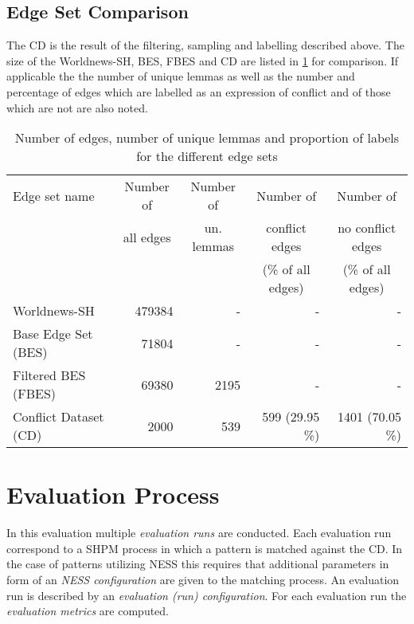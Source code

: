 \documentclass[11pt]{scrreprt}
\begin{document}

\subsection{Edge Set Comparison}
The CD is the result of the filtering, sampling and labelling described above. The size of the Worldnews-SH, BES, FBES and CD are listed in \cref{tab:dataset-descriptions} for comparison. If applicable the the number of unique lemmas as well as the number and percentage of edges which are labelled as an expression of conflict and of those which are not are also noted.


\begin{table}
\centering
\begin{tabular}{lrrrr}
\toprule
\multicolumn{1}{l}{Edge set name}	& \multicolumn{1}{c}{Number of} & \multicolumn{1}{c}{Number of}		& \multicolumn{1}{c}{Number of} 		& \multicolumn{1}{c}{Number of} \\
\multicolumn{1}{l}{} 				& \multicolumn{1}{c}{all edges} & \multicolumn{1}{c}{un. lemmas}			& \multicolumn{1}{c}{conflict edges} 	& \multicolumn{1}{c}{no conflict edges} \\
\multicolumn{1}{l}{} 				& \multicolumn{1}{c}{} 			& \multicolumn{1}{c}{}				& \multicolumn{1}{c}{(\% of all edges)} & \multicolumn{1}{c}{(\% of all edges)} \\
\midrule
Worldnews-SH						& 479384		& -			& -					& - \\
Base Edge Set (BES)					& 71804		& -			& -					& - \\
Filtered BES (FBES)					& 69380 		& 2195 		& - 					& - \\
Conflict Dataset (CD)				& 2000 		& 539 		& 599 (29.95 \%) 	& 1401 (70.05 \%) \\
\bottomrule
\end{tabular}
\caption{Number of edges, number of unique lemmas and proportion of labels for the different edge sets}
\label{tab:dataset-descriptions}
\end{table}


\section{Evaluation Process}
In this evaluation multiple \textit{evaluation runs} are conducted. Each evaluation run correspond to a SHPM process in which a pattern is matched against the CD. In the case of patterns utilizing NESS this requires that additional parameters in form of an \textit{NESS configuration} are given to the matching process. An evaluation run is described by an \textit{evaluation (run) configuration}. For each evaluation run the \textit{evaluation metrics} are computed. 
\end{document}
